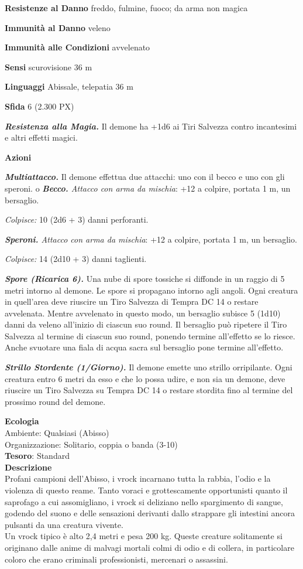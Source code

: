 \begin{multicols}{2}
	\textbf{Resistenze al Danno} freddo, fulmine, fuoco; da arma non magica

	\textbf{Immunità al Danno} veleno

	\textbf{Immunità alle Condizioni} avvelenato

	\textbf{Sensi} scurovisione 36 m

	\textbf{Linguaggi} Abissale, telepatia 36 m

	\textbf{Sfida} 6 (2.300 PX)

	\textit{\textbf{Resistenza alla Magia.}} Il demone ha +1d6 ai Tiri Salvezza contro incantesimi e altri effetti magici.

	\textbf{Azioni}

	\textit{\textbf{Multiattacco.}} Il demone effettua due attacchi: uno con il becco e uno con gli speroni.
	o
	\textit{\textbf{Becco.} Attacco con arma da mischia}: +12 a colpire, portata 1 m, un bersaglio.

	\textit{Colpisce:} 10 (2d6 + 3) danni perforanti.

	\textit{\textbf{Speroni.} Attacco con arma da mischia}: +12 a colpire, portata 1 m, un bersaglio.

	\textit{Colpisce:} 14 (2d10 + 3) danni taglienti.

	\textit{\textbf{Spore (Ricarica 6).}} Una nube di spore tossiche si diffonde in un raggio di 5 metri intorno al demone. Le spore si propagano intorno agli angoli. Ogni creatura in quell'area deve riuscire un Tiro Salvezza di Tempra DC 14 o restare avvelenata. Mentre  avvelenato in questo modo, un bersaglio subisce 5 (1d10) danni da  veleno all'inizio di ciascun suo round. Il bersaglio può ripetere il  Tiro Salvezza al termine di ciascun suo round, ponendo termine  all'effetto se lo riesce. Anche svuotare una fiala di acqua sacra sul  bersaglio pone termine all'effetto.

	\textit{\textbf{Strillo Stordente (1/Giorno).}} Il demone emette uno strillo orripilante. Ogni creatura entro 6 metri da esso e che lo possa udire, e non sia un demone, deve riuscire un Tiro Salvezza su Tempra DC 14 o restare stordita fino al termine del prossimo round del demone.

	\textbf{Ecologia}\\
	Ambiente: Qualsiasi (Abisso)\\
	Organizzazione: Solitario, coppia o banda (3-10)\\
	\textbf{Tesoro}: Standard\\
	\textbf{Descrizione}\\
	Profani campioni dell'Abisso, i vrock incarnano tutta la rabbia, l'odio e la violenza di questo reame. Tanto voraci e grottescamente opportunisti quanto il saprofago a cui assomigliano, i vrock si deliziano nello spargimento di sangue, godendo del suono e delle sensazioni derivanti dallo strappare gli intestini ancora pulsanti da una creatura vivente.\\
	Un vrock tipico è alto 2,4 metri e pesa 200 kg. Queste creature solitamente si originano dalle anime di malvagi mortali colmi di odio e di collera, in particolare coloro che erano criminali professionisti, mercenari o assassini.




\end{multicols}
